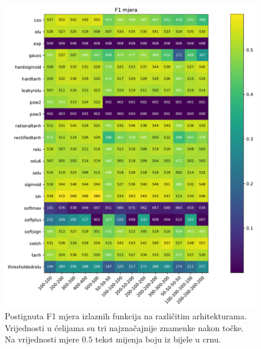 \documentclass[times, utf8, numeric, diplomski]{fer}
\begin{document}
\begin{figure}[ht]
\includegraphics[width=\textwidth]{greedy_256_f1.pdf}
\centering
\caption{Postignuta F1 mjera izlaznih funkcija na različitim arhitekturama. Vrijednosti u ćelijama su tri najznačajnije znamenke nakon točke. Na vrijednosti mjere $0.5$ tekst mijenja boju iz bijele u crnu.}
\label{fig:greedy_256_f1}
\end{figure}
\end{document}
